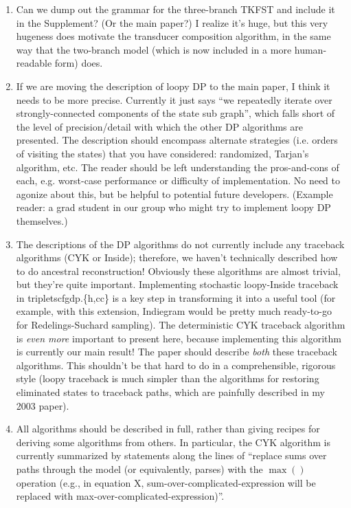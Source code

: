 {\begin{enumerate}
%
\item Can we dump out the grammar for the three-branch TKFST and include it in the Supplement?
(Or the main paper?) I realize it's huge, but this very hugeness does motivate the transducer composition algorithm,
in the same way that the two-branch model (which is now included in a more human-readable form) does.
%
\item If we are moving the description of loopy DP to the main paper, I think it needs to be more precise.
Currently it just says ``we repeatedly iterate over strongly-connected components of the state sub graph'',
which falls short of the level of precision/detail with which the other DP algorithms are presented.
The description should encompass alternate strategies (i.e. orders of visiting the states) that you have considered:
randomized, Tarjan's algorithm, etc.
The reader should be left understanding the pros-and-cons of each,
 e.g. worst-case performance or difficulty of implementation.
No need to agonize about this, but be helpful to potential future developers.
  (Example reader: a grad student in our group who might try to implement loopy DP themselves.)
%
\item The descriptions of the DP algorithms do not currently include any traceback algorithms (CYK or Inside);
therefore, we haven't technically described how to do ancestral reconstruction!
Obviously these algorithms are almost trivial, but they're quite important.
Implementing stochastic loopy-Inside traceback in tripletscfgdp.\{h,cc\} is a key step in transforming it into a useful tool
(for example, with this extension, Indiegram would be pretty much ready-to-go for Redelings-Suchard sampling).
The deterministic CYK traceback algorithm is {\em even more} important to present here, because implementing this algorithm is currently our main result!
The paper should describe {\em both} these traceback algorithms.
This shouldn't be that hard to do in a comprehensible, rigorous style
 (loopy traceback is much simpler than the algorithms for restoring eliminated states to traceback paths, which are painfully described in my 2003 paper).
%
\item All algorithms should be described in full, rather than giving recipes for deriving some algorithms from others.
In particular, the CYK algorithm is currently summarized by statements along the lines of
``replace sums over paths through the model (or equivalently, parses) with the $\max()$ operation (e.g., in equation X, sum-over-complicated-expression will be replaced with max-over-complicated-expression)''.

\end{enumerate}}
